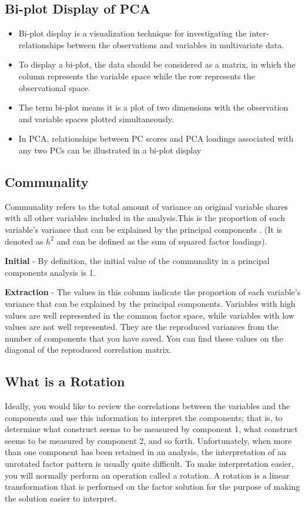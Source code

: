 \documentclass[a4paper,12pt]{article}
\begin{document}
\subsection{Bi-plot Display of PCA}
\begin{itemize}
\item Bi-plot display is a visualization technique for investigating
the inter-relationships between the observations and
variables in multivariate data.
\item  To display a bi-plot, the data should be considered as a
matrix, in which the column represents the variable space
while the row represents the observational space.
\item  The term bi-plot means it is a plot of two dimensions with the
observation and variable spaces plotted simultaneously.
\item  In PCA, relationships between PC scores and PCA loadings
associated with any two PCs can be illustrated in a bi-plot
display
\end{itemize}


\subsection{Communality} 
Communality refers to the total amount of variance an original variable shares with all other
variables included in the analysis.This is the proportion of each variable's variance that can be explained by the principal components .  (It is denoted as $h^2$ and can be defined as the sum of squared factor loadings).

\textbf{Initial} - By definition, the initial value of the communality in a principal components analysis is 1.

\textbf{Extraction}  - The values in this column indicate the proportion of each variable's variance that can be explained by the principal components.  Variables with high values are well represented in the common factor space, while variables with low values are not well represented. They are the reproduced variances from the number of components that you have saved.  You can find these values on the diagonal of the reproduced correlation matrix.


\subsection{What is a Rotation}

Ideally, you would like to review the correlations between the variables and the
components and use this information to interpret the components; that is, to determine what
construct seems to be measured by component 1, what construct seems to be measured by
component 2, and so forth. Unfortunately, when more than one component has been retained in
an analysis, the interpretation of an unrotated factor pattern is usually quite difficult. To make
interpretation easier, you will normally perform an operation called a rotation. A rotation is a
linear transformation that is performed on the factor solution for the purpose of making the
solution easier to interpret.
\end{document}
